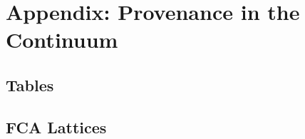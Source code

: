 \documentclass[runningheads]{llncs}
\begin{document}
%
%
%
\clearpage


%
\clearpage
\section*{Appendix: Provenance in the Continuum}

\subsection*{Tables}



\subsection*{FCA Lattices}

\end{document}
